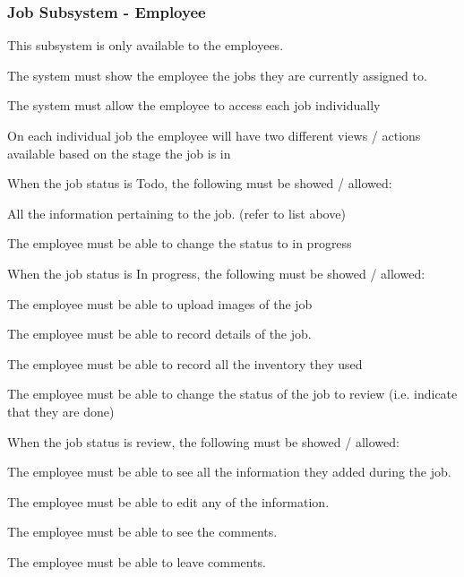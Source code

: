 \documentclass{article}
\begin{document}
	\subsubsection*{Job Subsystem - Employee}	
	\begin{list}{R.}{}
		\item This subsystem is only available to the employees.
		\item The system must show the employee the jobs they are currently assigned to. 
		\item The system must allow the employee to access each job individually
		\item On each individual job the employee will have two different views / actions available based on the stage the job is in
		\item When the job status is Todo, the following must be showed / allowed:
		\begin{list}{R.}{}
			\item All the information pertaining to the job. (refer to list above)
			\item The employee must be able to change the status to in progress
		\end{list}
		\item When the job status is In progress, the following must be showed / allowed:
		\begin{list}{R.}{}
			\item The employee must be able to upload images of the job
			\item The employee must be able to record details of the job.
			\item The employee must be able to record all the inventory they used 
			\item The employee must be able to change the status of the job to review (i.e. indicate that they are done)
		\end{list}
		\item When the job status is review, the following must be showed / allowed:
		\begin{list}{R.}{}
			\item The employee must be able to see all the information they added during the job.
			\item The employee must be able to edit any of the information. 
			\item The employee must be able to see the comments. 
			\item The employee must be able to leave comments.
		\end{list}
	\end{list}
	
\end{document}
